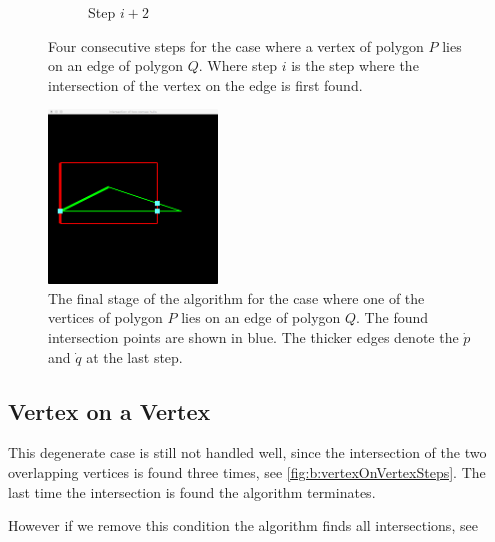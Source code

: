 \begin{figure}
\begin{subfigure}{0.24\textwidth}
				\caption{Step $i + 2$}
				\label{subfig:b:vertexOnEdge:step3}			
			\end{subfigure}				
			\caption{Four consecutive steps for the case where a vertex of polygon $P$ lies on an edge of polygon $Q$. Where step $i$ is the step where the intersection of the vertex on the edge is first found.}
			\label{fig:b:vertexOnEdgeSteps}
		\end{figure}

		\begin{figure}
			\centering
			\includegraphics[width=0.4\textwidth]{./img/b_result_deg_one}
			\caption{The final stage of the algorithm for the case where one of the vertices of polygon $P$ lies on an edge of polygon $Q$. The found intersection points are shown in blue. The thicker edges denote the $\dot{p}$ and $\dot{q}$ at the last step.}
			\label{fig:b:vertexOnEdge}
		\end{figure}

\subsection*{Vertex on a Vertex}
	This degenerate case is still not handled well, since the intersection of the two overlapping vertices is found three times, see \autoref{fig:b:vertexOnVertexSteps}. The last time the intersection is found the algorithm terminates.

	However if we remove this condition the algorithm finds all intersections, see 

